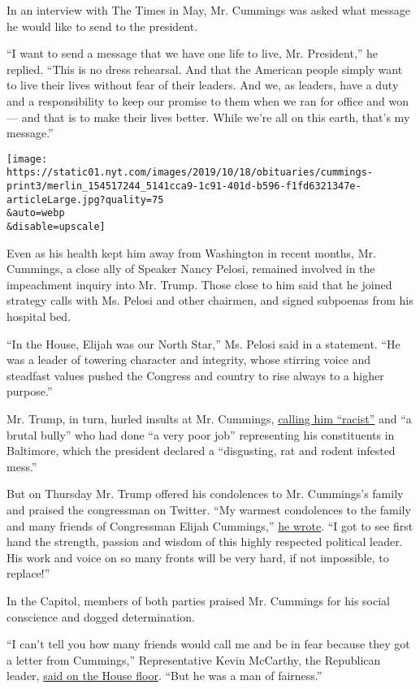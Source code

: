 In an interview with The Times in May, Mr. Cummings was asked what
message he would like to send to the president.

``I want to send a message that we have one life to live, Mr.
President,'' he replied. ``This is no dress rehearsal. And that the
American people simply want to live their lives without fear of their
leaders. And we, as leaders, have a duty and a responsibility to keep
our promise to them when we ran for office and won --- and that is to
make their lives better. While we're all on this earth, that's my
message.''

\texttt{[image: https://static01.nyt.com/images/2019/10/18/obituaries/cummings-print3/merlin\_154517244\_5141cca9-1c91-401d-b596-f1fd6321347e-articleLarge.jpg?quality=75\\\&auto=webp\\\&disable=upscale]}

Even as his health kept him away from Washington in recent months, Mr.
Cummings, a close ally of Speaker Nancy Pelosi, remained involved in the
impeachment inquiry into Mr. Trump. Those close to him said that he
joined strategy calls with Ms. Pelosi and other chairmen, and signed
subpoenas from his hospital bed.

``In the House, Elijah was our North Star,'' Ms. Pelosi said in a
statement. ``He was a leader of towering character and integrity, whose
stirring voice and steadfast values pushed the Congress and country to
rise always to a higher purpose.''

Mr. Trump, in turn, hurled insults at Mr. Cummings,
\href{https://www.nytimes.com/2019/07/28/us/politics/trump-elijah-cummings-baltimore.html}{calling
him ``racist''} and ``a brutal bully'' who had done ``a very poor job''
representing his constituents in Baltimore, which the president declared
a ``disgusting, rat and rodent infested mess.''

But on Thursday Mr. Trump offered his condolences to Mr. Cummings's
family and praised the congressman on Twitter. ``My warmest condolences
to the family and many friends of Congressman Elijah Cummings,''
\href{https://twitter.com/realDonaldTrump/status/1184815052546809862}{he
wrote}. ``I got to see first hand the strength, passion and wisdom of
this highly respected political leader. His work and voice on so many
fronts will be very hard, if not impossible, to replace!''

In the Capitol, members of both parties praised Mr. Cummings for his
social conscience and dogged determination.

``I can't tell you how many friends would call me and be in fear because
they got a letter from Cummings,'' Representative Kevin McCarthy, the
Republican leader,
\href{https://www.c-span.org/video/?465290-5/house-leadership-tributes-representative-elijah-cummings}{said
on the House floor}. ``But he was a man of fairness.''

